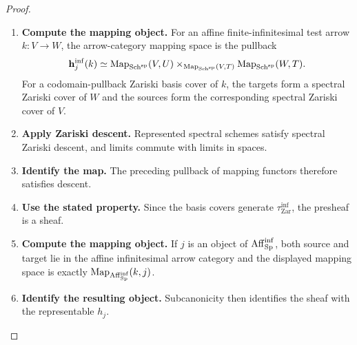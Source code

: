 \begin{proof}
\leavevmode
\begin{enumerate}[label=\textup{(\arabic*)}]
    \item \textbf{Compute the mapping object.}
    For an affine finite-infinitesimal test arrow \(k:V\to W\), the arrow-category mapping space
    is the pullback
    \[
    \begin{aligned}
        \mathbf h^{\inf}_j(k)
        \simeq
        \operatorname{Map}_{\operatorname{Sch}^{\mathrm{sp}}}(V,U)
        \times_{\operatorname{Map}_{\operatorname{Sch}^{\mathrm{sp}}}(V,T)}
        \operatorname{Map}_{\operatorname{Sch}^{\mathrm{sp}}}(W,T).
    \end{aligned}
    \]
    For a codomain-pullback Zariski basis cover of \(k\), the targets form a spectral
    Zariski cover of \(W\) and the sources form the corresponding spectral Zariski cover
    of \(V\).

    \item \textbf{Apply Zariski descent.}
    Represented spectral schemes satisfy spectral Zariski descent, and limits commute with
    limits in spaces.

    \item \textbf{Identify the map.}
    The preceding pullback of mapping functors therefore satisfies descent.

    \item \textbf{Use the stated property.}
    Since the basis covers generate \(\tau^{\inf}_{\mathrm{Zar}}\), the presheaf is a sheaf.

    \item \textbf{Compute the mapping object.}
    If \(j\) is an object of \(\operatorname{Aff}_{\operatorname{Sp}}^{\inf}\), both source and target lie in the affine
    infinitesimal arrow category and the displayed mapping space is exactly \(\operatorname{Map}_{\operatorname{Aff}_{\operatorname{Sp}}^{\inf}}(k,j)\).

    \item \textbf{Identify the resulting object.}
    Subcanonicity then identifies the sheaf with the representable \(h_j\).
\end{enumerate}
\end{proof}

